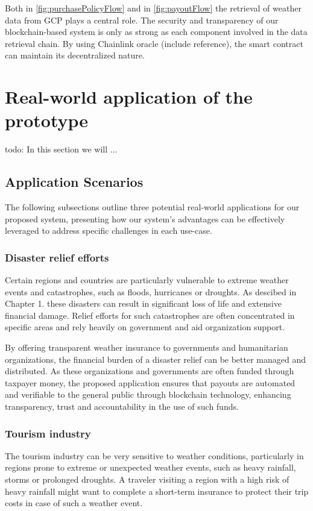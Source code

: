 Both in \cref{fig:purchasePolicyFlow} and in \cref{fig:payoutFlow} the retrieval of weather data from GCP plays a central role. The security and transparency of our blockchain-based system is only as strong as each component involved in the data retrieval chain. By using Chainlink oracle (include reference), the smart contract can maintain its decentralized nature. 


\section{Real-world application of the prototype}\label{section:real_world_application_prototype}

todo: In this section we will ...

\subsection{Application Scenarios}

The following subsections outline three potential real-world applications for our proposed system, presenting how our system's advantages can be effectively leveraged to address specific challenges in each use-case.

\subsubsection{Disaster relief efforts}\label{disaster_relief}
Certain regions and countries are particularly vulnerable to extreme weather events and catastrophes, such as floods, hurricanes or droughts. As descibed in Chapter 1. these disasters can result in significant loss of life and extensive financial damage. Relief efforts for such catastrophes are often concentrated in specific areas and rely heavily on government and aid organization support.

By offering transparent weather insurance to governments and humanitarian organizations, the financial burden of a disaster relief can be better managed and distributed. As these organizations and governments are often funded through taxpayer money, the proposed application ensures that payouts are automated and verifiable to the general public through blockchain technology, enhancing transparency, trust and accountability in the use of such funds.

\subsubsection{Tourism industry}
The tourism industry can be very sensitive to weather conditions, particularly in regions prone to extreme or unexpected weather events, such as heavy rainfall, storms or prolonged droughts. A traveler visiting a region with a high risk of heavy rainfall might want to complete a short-term insurance to protect their trip costs in case of such a weather event.

